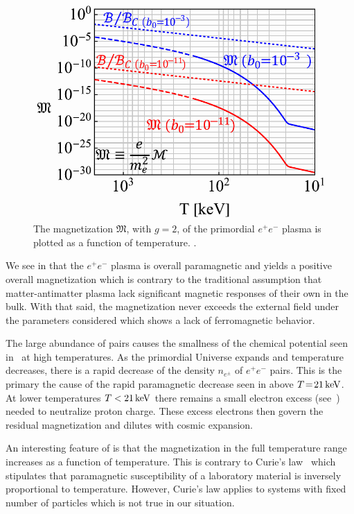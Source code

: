 \begin{figure}[ht]
 \centering
 \includegraphics[width=0.95\linewidth]{plots/thesis_mag.pdf}
 \caption{The magnetization ${\mathfrak M}$, with $g\!=\!2$, of the primordial $e^{+}e^{-}$ plasma is plotted as a function of temperature. . }
 \label{fig:magnet} 
\end{figure}

We see in  that the $e^{+}e^{-}$ plasma is overall paramagnetic and yields a positive overall magnetization which is contrary to the traditional assumption that matter-antimatter plasma lack significant magnetic responses of their own in the bulk. With that said, the magnetization never exceeds the external field under the parameters considered which shows a lack of ferromagnetic behavior. 

The large abundance of pairs causes the smallness of the chemical potential seen in~ at high temperatures. As the primordial Universe expands and temperature decreases, there is a rapid decrease of the density $n_{e^{\pm}}$ of $e^{+}e^{-}$ pairs. This is the primary the cause of the rapid paramagnetic decrease seen in  above $T\!=\!21\text{\,keV}$. At lower temperatures $T<21\text{\,keV}$ there remains a small electron excess (see~) needed to neutralize proton charge. These excess electrons then govern the residual magnetization and dilutes with cosmic expansion.

An interesting feature of  is that the magnetization in the full temperature range increases as a function of temperature. This is contrary to Curie's law~\cite{greiner2012thermodynamics} which stipulates that paramagnetic susceptibility of a laboratory material is inversely proportional to temperature. However, Curie's law applies to systems with fixed number of particles which is not true in our situation.

